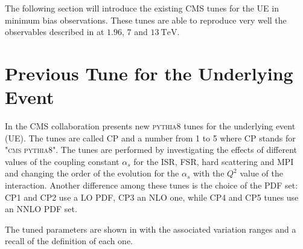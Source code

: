 The following section will introduce the existing CMS tunes for the  UE in minimum bias observations. These tunes are able to reproduce very well the observables described in  at $1.96$, $7$ and $13\ \mathrm{TeV}$. 


\section{Previous Tune for the Underlying Event}

In \cite{CPtunes} the CMS collaboration presents new \textsc{pythia8} tunes for the underlying event (UE). The tunes are called CP and a number from 1 to 5 where CP stands for \textsc{"cms pythia8"}. The tunes are performed by investigating the effects of different values of the coupling constant $\alpha_s$ for the ISR, FSR, hard scattering and MPI and changing the order of the evolution for the $\alpha_s$ with the $Q^2$ value of the interaction. Another difference among these tunes is the choice of the PDF set: CP1 and CP2 use a LO PDF, CP3 an NLO one, while CP4 and CP5 tunes use an NNLO PDF set. 

The tuned parameters are shown in  with the associated variation ranges and a recall of the definition of each one. 
\begin{table}[H]
	\centering
	\caption{This table reports the five parameters tuned for the UE  in CP* tunes, the variation ranges used for the sampling are shown in the last column. Table from \cite{CPtunes}}
	\label{table:CP5variations}
\end{table}

